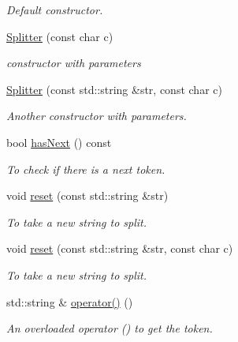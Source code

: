 \begin{DoxyCompactItemize}
\begin{DoxyCompactList}\small\item\em Default constructor. \item\end{DoxyCompactList}\item 
\hyperlink{classSplitter_ae9be005ba89c93690575bdb7826fc340}{Splitter} (const char c)
\begin{DoxyCompactList}\small\item\em constructor with parameters \item\end{DoxyCompactList}\item 
\hyperlink{classSplitter_ac86cd0ccc07d70cd79b1ed6b75fceb38}{Splitter} (const std::string \&str, const char c)
\begin{DoxyCompactList}\small\item\em Another constructor with parameters. \item\end{DoxyCompactList}\item 
bool \hyperlink{classSplitter_a6f65c75ceb97d11a55c8dcb9b7d9ce83}{hasNext} () const 
\begin{DoxyCompactList}\small\item\em To check if there is a next token. \item\end{DoxyCompactList}\item 
void \hyperlink{classSplitter_a78f226f811f328aba0693e74f93a96a0}{reset} (const std::string \&str)
\begin{DoxyCompactList}\small\item\em To take a new string to split. \item\end{DoxyCompactList}\item 
void \hyperlink{classSplitter_adf885b01df3fdb06f5cb989fa024fae7}{reset} (const std::string \&str, const char c)
\begin{DoxyCompactList}\small\item\em To take a new string to split. \item\end{DoxyCompactList}\item 
std::string \& \hyperlink{classSplitter_a2d05ab558b5ded29ec81650ca6f732dc}{operator()} ()
\begin{DoxyCompactList}\small\item\em An overloaded operator () to get the token. \item\end{DoxyCompactList}\end{DoxyCompactItemize}
